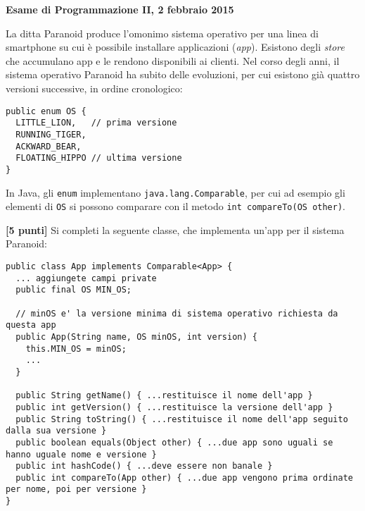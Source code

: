 \documentclass{article}[10pt]
\newcounter{esnu}
\newenvironment{esercizio}{\medskip \noindent {\bf Esercizio\addtocounter{esnu}{1} \arabic{esnu}}}{}
\begin{document}
\begin{center} {\bf Esame di Programmazione II, 2 febbraio 2015}\end{center}

La ditta Paranoid produce l'omonimo sistema operativo
per una linea di smartphone su cui \`e possibile installare applicazioni (\emph{app}).
Esistono degli \emph{store} che accumulano app e le rendono disponibili ai clienti. Nel corso degli
anni, il sistema operativo Paranoid ha subito delle evoluzioni, per cui esistono gi\`a quattro
versioni successive, in ordine cronologico:
%
{\small
\begin{verbatim}
public enum OS {
  LITTLE_LION,   // prima versione
  RUNNING_TIGER,
  ACKWARD_BEAR,
  FLOATING_HIPPO // ultima versione
}
\end{verbatim}
}

\noindent
In Java, gli \texttt{enum} implementano \texttt{java.lang.Comparable}, per cui ad esempio gli elementi
di \texttt{OS} si possono comparare con il metodo \texttt{int compareTo(OS other)}.

\begin{esercizio}
\textbf{[5 punti]}
%
Si completi la seguente classe, che implementa un'app per il sistema Paranoid:
%
{\small
\begin{verbatim}
public class App implements Comparable<App> {
  ... aggiungete campi private
  public final OS MIN_OS;

  // minOS e' la versione minima di sistema operativo richiesta da questa app
  public App(String name, OS minOS, int version) {
    this.MIN_OS = minOS;
    ...
  }

  public String getName() { ...restituisce il nome dell'app }
  public int getVersion() { ...restituisce la versione dell'app }
  public String toString() { ...restituisce il nome dell'app seguito dalla sua versione }
  public boolean equals(Object other) { ...due app sono uguali se hanno uguale nome e versione }
  public int hashCode() { ...deve essere non banale }
  public int compareTo(App other) { ...due app vengono prima ordinate per nome, poi per versione }
}
\end{verbatim}}

\end{esercizio}
\end{document}
